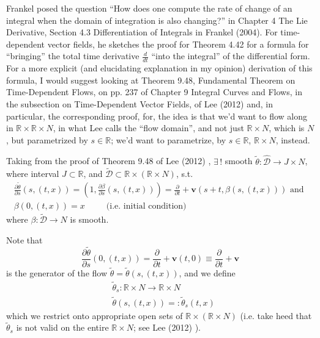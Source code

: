 \documentclass[twoside,landscape,10pt]{amsart}
\theoremstyle{plain}
\theoremstyle{definition}
\theoremstyle{remark}
\theoremstyle{remark}
\begin{document}
\begin{multicols*}{2}
Frankel posed the question ``How does one compute the rate of change of an integral when the domain of integration is also changing?'' in Chapter 4 The Lie Derivative, Section 4.3 Differentiation of Integrals in Frankel (2004).  For time-dependent vector fields, he sketches the proof for Theorem 4.42 for a formula for ``bringing'' the total time derivative $\frac{d}{dt}$ ``into the integral'' of the differential form.  For a more explicit (and elucidating explanation in my opinion) derivation of this formula, I would suggest looking at Theorem 9.48, Fundamental Theorem on Time-Dependent Flows, on pp. 237 of Chapter 9 Integral Curves and Flows, in the subsection on Time-Dependent Vector Fields, of Lee (2012) \cite{JLee2012} and, in particular, the corresponding proof, for, the idea is that we'd want to flow along in $\mathbb{R} \times \mathbb{R} \times N$, in what Lee calls the ``flow domain'', and not just $\mathbb{R} \times N$, which is $N$, but parametrized by $s \in \mathbb{R}$; we'd want to parametrize, by $s\in \mathbb{R}$, $\mathbb{R} \times N$, instead.  

Taking from the proof of Theorem 9.48 of Lee (2012) \cite{JLee2012}, $\exists \, !$ smooth $\widetilde{\theta}: \widehat{\mathcal{D}} \to J \times N$, where interval $J \subset \mathbb{R}$, and $\widetilde{\mathcal{D}} \subset \mathbb{R} \times ( \mathbb{R} \times N)$, s.t. 
\[
\begin{gathered}
  \frac{ \partial \widetilde{\theta}}{ \partial s }(s,(t,x)) = (1, \frac{ \partial \beta}{ \partial s}(s,(t,x))) = \frac{ \partial }{ \partial t} + \mathbf{v}(s+t, \beta(s,(t,x)))  \text{ and } \\
  \beta(0,(t,x)) =x \qquad \, \text{ (i.e. initial condition) }
\end{gathered}
\]  
where $\beta : \widetilde{\mathcal{D}} \to N$ is smooth.  

Note that 
\[
\frac{ \partial \widetilde{\theta}}{ \partial s}(0,(t,x)) = \frac{ \partial }{ \partial t} + \mathbf{v}(t,0) \equiv \frac{ \partial }{ \partial t} + \mathbf{v}
\]
is the generator of the flow $\widetilde{\theta} = \widetilde{\theta}(s,(t,x))$, and we define 
\[
\begin{aligned}
& \widetilde{\theta}_s: \mathbb{R} \times N \to \mathbb{R} \times N \\ 
  & \widetilde{\theta}(s,(t,x)) =: \widetilde{\theta}_s(t,x)
\end{aligned}
\]
which we restrict onto appropriate open sets of $\mathbb{R} \times (\mathbb{R} \times N)$ (i.e. take heed that $\widetilde{\theta}_s$ is not valid on the entire $\mathbb{R} \times N$; see Lee (2012) \cite{JLee2012}).  


\end{multicols*}
\end{document}
